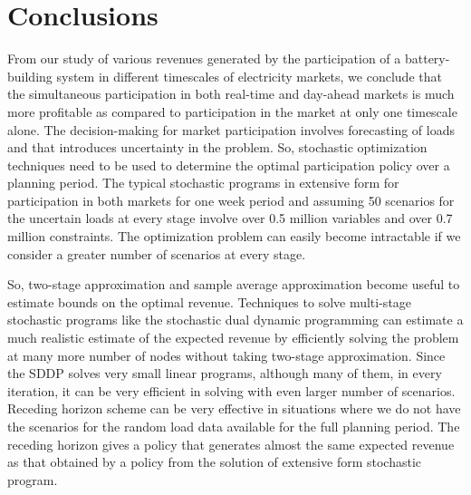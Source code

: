\documentclass[11pt,twoside]{article}
\begin{document}
\section{Conclusions}
From our study of various revenues generated by the participation of a battery-building system in different timescales of electricity markets, we conclude that the simultaneous participation in both real-time and day-ahead markets is much more profitable as compared to participation in the market at only one timescale alone. The decision-making for market participation involves forecasting of loads and that introduces uncertainty in the problem. So, stochastic optimization techniques need to be used to determine the optimal participation policy over a planning period. The typical stochastic programs in extensive form for participation in both markets for one week period and assuming 50 scenarios for the uncertain loads at every stage involve over 0.5 million variables and over 0.7 million constraints. The optimization problem can easily become intractable if we consider a greater number of scenarios at every stage. 

So, two-stage approximation and sample average approximation become useful to estimate bounds on the optimal revenue. Techniques to solve multi-stage stochastic programs like the stochastic dual dynamic programming can estimate a much realistic estimate of the expected revenue by efficiently solving the problem at many more number of nodes without taking two-stage approximation. Since the SDDP solves very small linear programs, although many of them, in every iteration, it can be very efficient in solving with even larger number of scenarios. Receding horizon scheme can be very effective in situations where we do not have the scenarios for the random load data available for the full planning period. The receding horizon gives a policy that generates almost the same expected revenue as that obtained by a policy from the solution of extensive form stochastic program.
\end{document}
